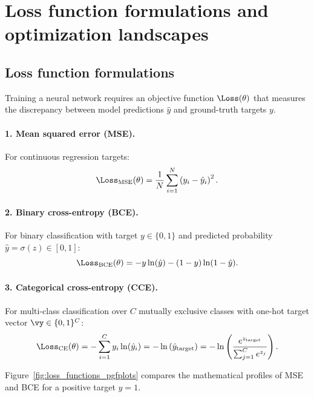 \documentclass[../../main.tex]{subfiles}
\begin{document}
\section{Loss function formulations and optimization landscapes}
\label{sec:output_loss_opt}

\subsection{Loss function formulations}
Training a neural network requires an objective function $\Loss(\theta)$ that measures the discrepancy between model predictions $\hat{y}$ and ground-truth targets $y$.

\paragraph{1. Mean squared error (MSE).}
For continuous regression targets:
\begin{equation}
\label{eq:mse_loss}
\Loss_{\text{MSE}}(\theta) = \frac{1}{N} \sum_{i=1}^N \left( y_i - \hat{y}_i \right)^2.
\end{equation}

\paragraph{2. Binary cross-entropy (BCE).}
For binary classification with target $y \in \{0, 1\}$ and predicted probability $\hat{y} = \sigma(z) \in [0, 1]$:
\begin{equation}
\label{eq:bce_loss}
\Loss_{\text{BCE}}(\theta) = - y \ln(\hat{y}) - (1 - y) \ln(1 - \hat{y}).
\end{equation}

\paragraph{3. Categorical cross-entropy (CCE).}
For multi-class classification over $C$ mutually exclusive classes with one-hot target vector $\vy \in \{0, 1\}^C$:
\begin{equation}
\label{eq:cce_loss}
\Loss_{\text{CE}}(\theta) = - \sum_{i=1}^C y_i \ln(\hat{y}_i) = - \ln\left( \hat{y}_{\text{target}} \right) = - \ln\left( \frac{e^{z_{\text{target}}}}{\sum_{j=1}^C e^{z_j}} \right).
\end{equation}

Figure~\ref{fig:loss_functions_pgfplots} compares the mathematical profiles of MSE and BCE for a positive target $y = 1$.
\end{document}
